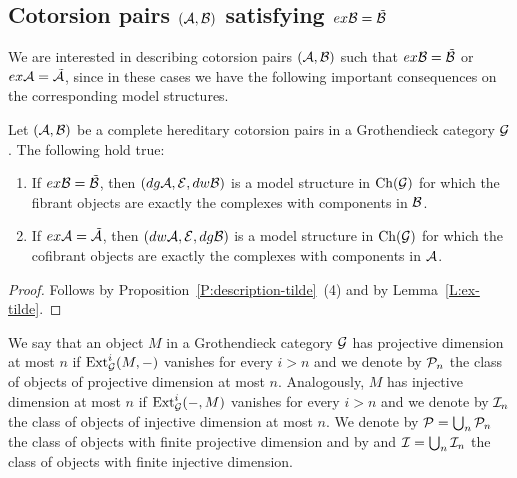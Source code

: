 \subsection{Cotorsion pairs \texorpdfstring{$(\mathcal{A}, \mathcal{B})$}{(A,B)} satisfying \texorpdfstring{$ex\mathcal{B}=\tilde{\mathcal{B}}$}{ex B = tilde B} }\label{S:2}
We are interested in describing cotorsion pairs $(\mathcal{A}, \mathcal{B})$ such that $ex\mathcal{B}=\tilde {\mathcal{B}}$ or $ex\mathcal{A}=\tilde {\mathcal{A}}$, since in these cases we have the following important consequences on the corresponding model structures.
%
\begin{cor}\label{C:cofibrant-fibrant}  Let $(\mathcal{A}, \mathcal{B})$ be a complete hereditary cotorsion pairs in a Grothendieck category $\mathcal{G}$. The following hold true:
\begin{enumerate}
\item  If $ex\mathcal{B}=\tilde {\mathcal{B}}$, then $(dg\mathcal{A}, \mathcal{E}, dw\mathcal{B})$ is a model structure in $\mathrm{Ch}(\mathcal{G})$ for which the fibrant objects are exactly the complexes with components in $\mathcal{B}$.
\item If $ex\mathcal{A}=\tilde {\mathcal{A}}$, then $(dw\mathcal{A}, \mathcal{E}, dg\mathcal{B})$ is a model structure in $\mathrm{Ch}(\mathcal{G})$ for which the cofibrant objects are exactly the complexes with components in $\mathcal{A}$.
\end{enumerate}
\end{cor}
%
\begin{proof} Follows by Proposition~\ref{P:description-tilde}~(4) and by Lemma~\ref{L:ex-tilde}.
\end{proof}

We say that an object $M$ in a Grothendieck category $\mathcal{G}$ has projective dimension at most $n$ if $\operatorname{Ext}_{\mathcal{G}}^i(M, -)$ vanishes for every $i>n$ and we denote by $\mathcal{P}_n$ the class of objects of projective dimension at most $n$.
 Analogously, $M$ has injective dimension at most $n$ if $\operatorname{Ext}_{\mathcal{G}}^i(-, M)$ vanishes for every $i>n$ and we denote by $\mathcal{I}_n$ the class of objects of  injective dimension at most $n$. We denote by $\mathcal{P}=\bigcup_n\mathcal{P}_n$ the class of objects with finite projective dimension and by and $\mathcal{I}=\bigcup_n\mathcal{I}_n$ the class of objects with finite injective dimension.

